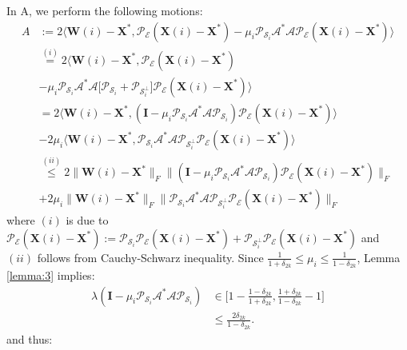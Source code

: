 \documentclass[twocolumn]{svjour3}
\newcommand{\vectornormbig}[1]{\big\|#1\big\|}
\newcommand{\sensing}{\boldsymbol{\mathcal{A}}}
\newcommand{\signal}{\boldsymbol{X}}
\newcommand{\bestsignal}{\boldsymbol{X}^\ast}
\newcommand{\id}{\mathbf{I}}
\newcommand{\rank}{k}
\begin{document}
In A, we perform the following motions:
\begin{align}
A &:= 2\langle \boldsymbol{W}(i) - \bestsignal, \mathcal{P}_{\mathcal{E}}(\signal(i) - \bestsignal) - \mu_i \mathcal{P}_{\mathcal{S}_i}\sensing^\ast \sensing \mathcal{P}_{\mathcal{E}} (\signal(i) - \bestsignal) \rangle \nonumber \\
&\stackrel{(i)}{=} 2\langle \boldsymbol{W}(i) - \bestsignal, \mathcal{P}_{\mathcal{E}}(\signal(i) - \bestsignal) \nonumber \\ &-\mu_i \mathcal{P}_{\mathcal{S}_i}\sensing^\ast \sensing \big[\mathcal{P}_{\mathcal{S}_i} + \mathcal{P}_{\mathcal{S}_i^{\bot}}\big]\mathcal{P}_{\mathcal{E}} (\signal(i) - \bestsignal) \rangle \nonumber \\
& = 2\langle \boldsymbol{W}(i) - \bestsignal, (\id - \mu_i\mathcal{P}_{\mathcal{S}_i}\sensing^\ast \sensing \mathcal{P}_{\mathcal{S}_i}) \mathcal{P}_{\mathcal{E}} (\signal(i) - \bestsignal) \rangle \nonumber \nonumber \\ &- 2\mu_i \langle \boldsymbol{W}(i) - \bestsignal, \mathcal{P}_{\mathcal{S}_i}\sensing^\ast \sensing \mathcal{P}_{\mathcal{S}_i^{\bot}} \mathcal{P}_{\mathcal{E}} (\signal(i) - \bestsignal) \rangle \nonumber \\
&\stackrel{(ii)}{\leq} 2\vectornormbig{\boldsymbol{W}(i) - \bestsignal}_F \vectornormbig{ (\id - \mu_i \mathcal{P}_{\mathcal{S}_i}\sensing^\ast \sensing \mathcal{P}_{\mathcal{S}_i}) \mathcal{P}_{\mathcal{E}} (\signal(i) - \bestsignal)}_F \nonumber \\ &+ 2\mu_i \vectornormbig{\boldsymbol{W}(i) - \bestsignal}_F \vectornormbig{\mathcal{P}_{\mathcal{S}_i}\sensing^\ast \sensing \mathcal{P}_{\mathcal{S}_i^{\bot}}\mathcal{P}_{\mathcal{E}}(\signal(i) - \bestsignal)}_F
\label{eq:mALPS:04}
\end{align} where $ (i) $ is due to $ \mathcal{P}_{\mathcal{E}}(\signal(i) - \bestsignal) := \mathcal{P}_{\mathcal{S}_i} \mathcal{P}_{\mathcal{E}}(\signal(i) - \bestsignal) + \mathcal{P}_{\mathcal{S}_i^{\bot}} \mathcal{P}_{\mathcal{E}}(\signal(i) - \bestsignal) $ and $ (ii) $ follows from Cauchy-Schwarz inequality. Since $ \frac{1}{1+\delta_{2\rank}} \leq \mu_i \leq \frac{1}{1-\delta_{2\rank}} $, Lemma \ref{lemma:3} implies:
\begin{align}
\lambda(\id - \mu_i\mathcal{P}_{\mathcal{S}_i}\sensing^\ast \sensing \mathcal{P}_{\mathcal{S}_i}) &\in \Bigg[1 - \frac{1-\delta_{2\rank}}{1+\delta_{2\rank}}, \frac{1+\delta_{2\rank}}{1-\delta_{2\rank}} - 1\Bigg] \nonumber \\ &\leq \frac{2\delta_{2\rank}}{1-\delta_{2\rank}}. \nonumber
\end{align} and thus:
\end{document}
